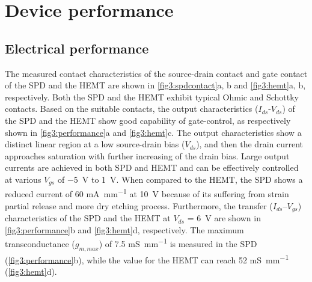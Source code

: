 \section{Device performance}
\label{sec:Device performance chapter3}

\subsection{Electrical performance}
\label{sec:Electrical modulation chapter3}

 The measured  contact  characteristics of the source-drain contact and gate contact of the SPD  and the HEMT are shown in \autoref{fig3:spdcontact}a, b and \autoref{fig3:hemt}a, b, respectively. Both the SPD and the HEMT exhibit typical Ohmic and Schottky contacts. Based on the suitable contacts, the output characteristics ($I_{ds}$-$V_{ds}$) of the SPD  and the HEMT show good capability of gate-control, as respectively shown in \autoref{fig3:performance}a and \autoref{fig3:hemt}c. The output characteristics show a distinct linear region at a low source-drain bias ($V_{ds}$), and then the drain current  approaches saturation with further increasing of the drain bias. Large output currents  are achieved in both SPD and HEMT and can be effectively controlled at various $V_{gs}$ of \SI{-5}{\volt} to \SI{1}{\volt}. When compared to the HEMT, the SPD shows a reduced current of 60 \unit{\mA\per\mm} at \SI{10}{\volt} because of its suffering from strain  partial release and more dry etching  process. Furthermore, the transfer ($I_{ds}$–$V_{gs}$) characteristics of the SPD  and the HEMT at $V_{ds}$ = \SI{6}{\volt} are shown in \autoref{fig3:performance}b and \autoref{fig3:hemt}d, respectively. The maximum transconductance  ($g_{m,max}$) of 7.5 \unit{\milli\siemens\per\mm} is measured in the SPD (\autoref{fig3:performance}b), while the value for the HEMT can reach 52 \unit{\milli\siemens\per\mm} (\autoref{fig3:hemt}d). 

